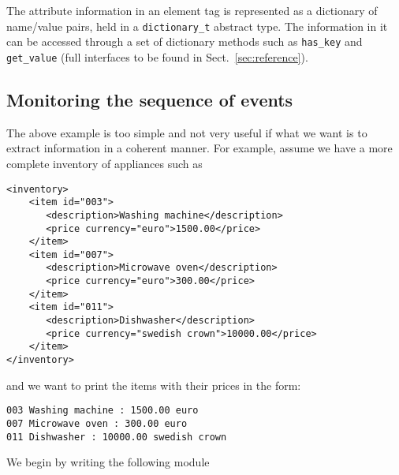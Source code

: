 \documentclass[11pt]{article}
\begin{document}
The attribute information in an element tag is represented as a
dictionary of name/value pairs, held in a \texttt{dictionary\_t}
abstract type.  The information in it can be accessed through a set of
dictionary methods such as \texttt{has\_key} and \texttt{get\_value}
(full interfaces to be found in Sect.~\ref{sec:reference}).

\subsection{Monitoring the sequence of events}
The above example is too simple and not very useful if what we want is
to extract information in a coherent manner. For example, assume we
have a more complete inventory of appliances such as
%
\begin{verbatim}
<inventory>
	<item id="003">                                                
	   <description>Washing machine</description>  
	   <price currency="euro">1500.00</price>  
	</item>                                                            
	<item id="007">                                                
	   <description>Microwave oven</description>  
	   <price currency="euro">300.00</price>  
	</item>                    
	<item id="011">                                                
	   <description>Dishwasher</description>  
	   <price currency="swedish crown">10000.00</price>  
	</item>    
</inventory>                                                                        
\end{verbatim}
%
and we want to print the items with their prices in the form:
%
\begin{verbatim}
003 Washing machine : 1500.00 euro
007 Microwave oven : 300.00 euro
011 Dishwasher : 10000.00 swedish crown
\end{verbatim}

We begin by writing the following module
\end{document}
